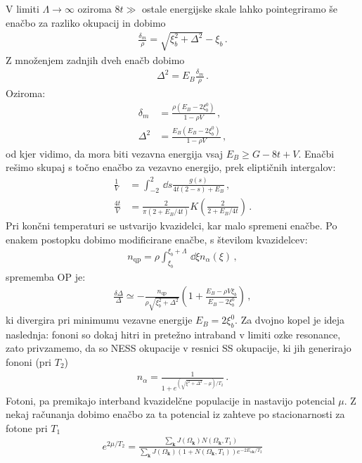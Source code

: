 \documentclass[a4paper,10pt]{article}
\renewcommand{\vec}[1]{\mathbf{#1}}
\begin{document}
V limiti $\Lambda\to \infty$ oziroma $8t \gg$ ostale energijske skale lahko pointegriramo še enačbo za razliko okupacij in dobimo
\begin{align}
  \frac{\delta_m}{\rho} = \sqrt{\xi_b^2+\Delta^2} - \xi_b\,.
\end{align}
Z množenjem zadnjih dveh enačb dobimo
\begin{align}
  \Delta^2 = E_B \frac{\delta_m}{\rho}\,.
\end{align}
Oziroma: 
\begin{align}
  \delta_m &= \frac{\rho (E_B - 2\xi_b^0)}{1-\rho V}\,,\\
  \Delta^2 &= \frac{E_B(E_B - 2\xi_b^0)}{1-\rho V}\,,
\end{align}
od kjer vidimo, da mora biti vezavna energija vsaj $E_B \geq G - 8t + V$. Enačbi rešimo skupaj s točno enačbo za vezavno energijo, prek eliptičnih intergalov: 
\begin{align}
  \frac{1}{V} &=  \int_{-2}^{2} \,\dd{s}\frac{g(s)}{4t(2-s)+ E_B}\,,\\
  \frac{4t}{V} &= \frac{2}{\pi (2+ E_B/4t)} K\left(\frac{2}{2+ E_B/4t}\right)\,.
\end{align}
Pri končni temperaturi se ustvarijo kvazidelci, kar malo spremeni enačbe. Po enakem postopku dobimo modificirane enačbe, s številom kvazidelcev:  
\begin{align}
  n_\text{qp} =\rho \int_{\xi_b}^{\xi_b + \Lambda} \,\dd{\xi} n_\alpha(\xi)\,,
\end{align}
sprememba OP je: 
\begin{align}
  \frac{\delta \Delta}{\Delta} \simeq - \frac{n_\text{qp}}{\rho \sqrt{\xi_b^2+\Delta^2}} \left(1+ \frac{E_B - \rho V \xi_b}{E_B - 2\xi_b^0}\right)\,,
\end{align}
ki divergira pri minimumu vezavne energije $E_B = 2\xi_b^0$. Za dvojno kopel je ideja naslednja: fononi so dokaj hitri in pretežno intraband v limiti ozke resonance, zato privzamemo, da so NESS okupacije v resnici SS okupacije, ki jih generirajo fononi (pri $T_2$)
\begin{align}
  n_\alpha = \frac{1}{1+e^{(\sqrt{\xi^2 + \Delta^2}-\mu)/T_2}}\,.
\end{align} 
Fotoni, pa premikajo interband kvazidelčne populacije in nastavijo potencial $\mu$. Z nekaj računanja dobimo enačbo za ta potencial iz zahteve po stacionarnosti za fotone pri $T_1$
\begin{align}
  e^{2\mu / T_2} = \frac{\sum_\vec{k} J(\Omega_\vec{k}) N(\Omega_\vec{k}, T_1)}{\sum_\vec{k} J(\Omega_\vec{k}) (1+N(\Omega_\vec{k}, T_1)) e^{-2E_{\alpha \vec{k}}/T_2}}
\end{align}
\end{document}
